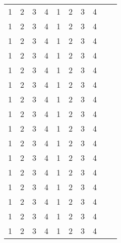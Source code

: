 \documentclass[12pt]{article}
\begin{document}
\begin{center}
\begin{longtable}{llllllllll}
1 & 2 & 3 & 4 & 1 & 2 & 3 & 4 \\ 1 & 2 & 3 & 4 & 1 & 2 & 3 & 4 \\ 1 & 2 & 3 & 4 & 1 & 2 & 3 & 4 \\ 1 & 2 & 3 & 4 & 1 & 2 & 3 & 4 \\
1 & 2 & 3 & 4 & 1 & 2 & 3 & 4 \\ 1 & 2 & 3 & 4 & 1 & 2 & 3 & 4 \\ 1 & 2 & 3 & 4 & 1 & 2 & 3 & 4 \\ 1 & 2 & 3 & 4 & 1 & 2 & 3 & 4 \\
1 & 2 & 3 & 4 & 1 & 2 & 3 & 4 \\ 1 & 2 & 3 & 4 & 1 & 2 & 3 & 4 \\ 1 & 2 & 3 & 4 & 1 & 2 & 3 & 4 \\ 1 & 2 & 3 & 4 & 1 & 2 & 3 & 4 \\
1 & 2 & 3 & 4 & 1 & 2 & 3 & 4 \\ 1 & 2 & 3 & 4 & 1 & 2 & 3 & 4 \\ 1 & 2 & 3 & 4 & 1 & 2 & 3 & 4 \\ 1 & 2 & 3 & 4 & 1 & 2 & 3 & 4 \\
\end{longtable}
\end{center}
\end{document}
